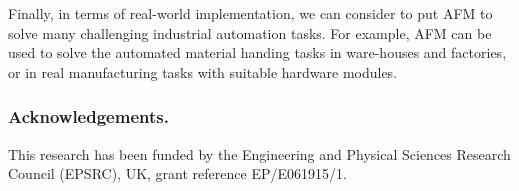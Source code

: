 \documentclass[smallcondensed]{svjour3}
\begin{document}
Finally, in terms of real-world implementation, we can consider to put AFM to solve many challenging industrial automation tasks. For example, AFM can be used to solve the automated material handing tasks in ware-houses and factories, or in real manufacturing tasks with suitable hardware modules. %
\subsubsection*{Acknowledgements. } 
This research has been funded by the Engineering and Physical Sciences Research Council (EPSRC), UK, grant reference EP/E061915/1.
 
%
%
%            
%
\end{document}
